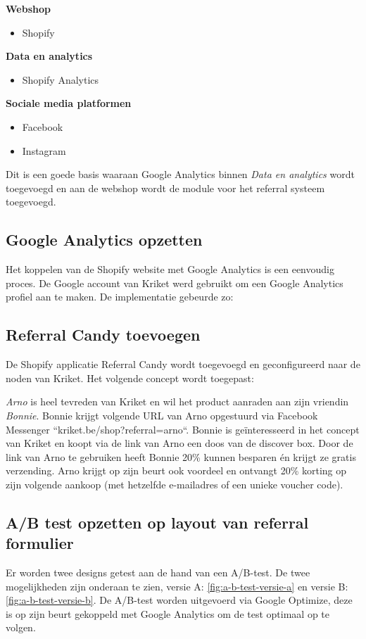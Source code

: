 \textbf{Webshop}
\begin{itemize}
	\item Shopify
\end{itemize}

\textbf{Data en analytics}
\begin{itemize}
	\item Shopify Analytics
\end{itemize}

\textbf{Sociale media platformen}
\begin{itemize}
	\item Facebook
	\item Instagram
\end{itemize}

Dit is een goede basis waaraan Google Analytics binnen \emph{Data en analytics} wordt toegevoegd en aan de webshop wordt de module voor het referral systeem toegevoegd.

\subsection{Google Analytics opzetten} \label{sec:google-analytics-opzetten}
Het koppelen van de Shopify website met Google Analytics is een eenvoudig proces. De Google account van Kriket werd gebruikt om een Google Analytics profiel aan te maken. De implementatie gebeurde zo:

\subsection{Referral Candy toevoegen} \label{sec:referral-candy-toevoegen}
De Shopify applicatie Referral Candy wordt toegevoegd en geconfigureerd naar de noden van Kriket. Het volgende concept wordt toegepast:

\emph{Arno} is heel tevreden van Kriket en wil het product aanraden aan zijn vriendin \emph{Bonnie}. Bonnie krijgt volgende URL van Arno opgestuurd via Facebook Messenger ``kriket.be/shop?referral=arno``. Bonnie is geïnteresseerd in het concept van Kriket en koopt via de link van Arno een doos van de discover box. Door de link van Arno te gebruiken heeft Bonnie 20\% kunnen besparen én krijgt ze gratis verzending. Arno krijgt op zijn beurt ook voordeel en ontvangt 20\% korting op zijn volgende aankoop (met hetzelfde e-mailadres of een unieke voucher code).

\subsection{A/B test opzetten op layout van referral formulier} \label{sec:a-b-test-opzetten}
Er worden twee designs getest aan de hand van een A/B-test. De twee mogelijkheden zijn onderaan te zien, versie A: \ref{fig:a-b-test-versie-a} en versie B: \ref{fig:a-b-test-versie-b}. De A/B-test worden uitgevoerd via Google Optimize, deze is op zijn beurt gekoppeld met Google Analytics om de test optimaal op te volgen.

